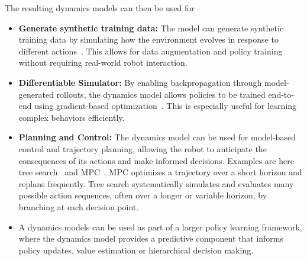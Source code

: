 The resulting dynamics models can then be used for 
\begin{itemize}
    \item \textbf{Generate synthetic training data:}
    The model can generate synthetic training data by simulating how the environment evolves in response to different actions~\cite{Yang2023LearningIR, Bruce2024GenieGI}. This allows for data augmentation and policy training without requiring real-world robot interaction. 
    \item \textbf{Differentiable Simulator:}
    By enabling backpropagation through model-generated rollouts, the dynamics model allows policies to be trained end-to-end using gradient-based optimization~\cite{Seo2022ReinforcementLW, Wu2023PretrainingCW, Hafner2023MasteringDD}. This is especially useful for learning complex behaviors efficiently.
    \item \textbf{Planning and Control:}
    The dynamics model can be used for model-based control and trajectory planning, allowing the robot to anticipate the consequences of its actions and make informed decisions. Examples are here tree search~\cite{Du2023VideoLP} and \acf{MPC}~\cite{Rybkin2018LearningWY, Mendonca2023StructuredWM}. \ac{MPC} optimizes a trajectory over a short horizon and replans frequently. Tree search systematically simulates and evaluates many possible action sequences, often over a longer or variable horizon, by branching at each decision point. %


    \item A dynamics models can be used as part of a larger policy learning framework, where the dynamics model provides a predictive component that informs policy updates, value estimation or hierarchical decision making.
\end{itemize}

